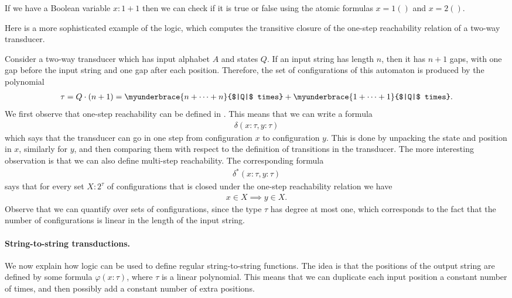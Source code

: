 \begin{myexample}
    If we have a Boolean variable $x : 1+1$ then we can check if it is true or false using the atomic formulas $x = 1()$ and $x = 2()$.
\end{myexample}

Here is a more sophisticated example of the logic, which computes the transitive closure of the one-step reachability relation of a two-way transducer. 

\begin{myexample}\label{ex:reachability-of-configurations}
    Consider a two-way transducer which has input alphabet $A$ and states $Q$. If an input string has length $n$, then it has $n+1$ gaps, with one gap before the input string and one gap after each position. Therefore,  the set of configurations of this automaton is produced by the polynomial 
    \begin{align*}
    \tau = Q \cdot (n +1) = 
    \myunderbrace{n + \cdots + n}{$|Q|$ times} + 
    \myunderbrace{1 + \cdots + 1}{$|Q|$ times}.
    \end{align*}
    We first observe that one-step reachability can be defined in \mso. This means that we can write a formula
    \begin{align*}
    \delta(x: \tau, y : \tau)
    \end{align*}
    which says that the transducer can go in one step from configuration $x$ to configuration $y$. This is done by unpacking the state and position in $x$, similarly for $y$, and then comparing them with respect to the definition of transitions in the transducer. The more interesting observation is that we can also define multi-step reachability. The corresponding formula
        \begin{align*}
    \delta^*(x: \tau, y : \tau)
    \end{align*}
    says that for every set $X : 2^\tau$ of configurations that is closed under the one-step reachability relation we have 
    \begin{align*}
    x \in X \implies y \in X.
    \end{align*} Observe that we can quantify over sets of configurations, since the type $\tau$ has degree at most one, which corresponds to the fact that the number of configurations is linear in the length of the input string. 
\end{myexample}


\paragraph*{String-to-string \mso transductions.}
We now explain how \mso logic can be used to define regular string-to-string functions. The idea is that the positions of the output string are defined by some formula $\varphi(x : \tau)$, where $\tau$ is a linear polynomial. This means that we can duplicate each input position a constant number of times, and then possibly add a constant number of extra positions. 



